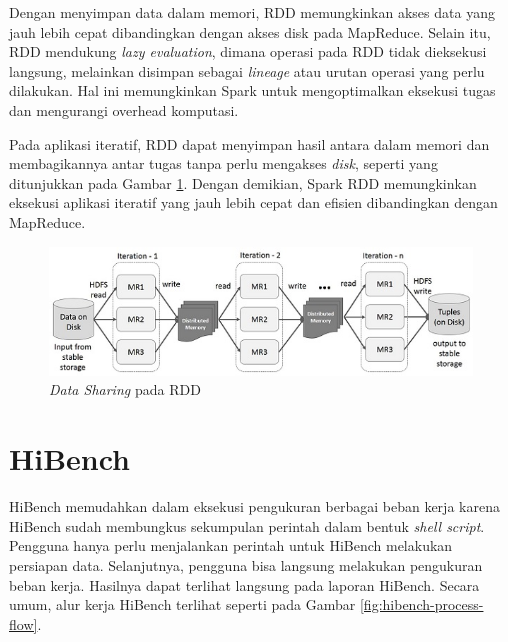 Dengan menyimpan data dalam memori, RDD memungkinkan akses data yang jauh lebih cepat dibandingkan dengan akses disk pada MapReduce. Selain itu, RDD mendukung \textit{lazy evaluation}, dimana operasi pada RDD tidak dieksekusi langsung, melainkan disimpan sebagai \textit{lineage} atau urutan operasi yang perlu dilakukan. Hal ini memungkinkan Spark untuk mengoptimalkan eksekusi tugas dan mengurangi overhead komputasi.

Pada aplikasi iteratif, RDD dapat menyimpan hasil antara dalam memori dan membagikannya antar tugas tanpa perlu mengakses \textit{disk}, seperti yang ditunjukkan pada Gambar \ref{fig:iterative_operations_on_spark_rdd}. Dengan demikian, Spark RDD memungkinkan eksekusi aplikasi iteratif yang jauh lebih cepat dan efisien dibandingkan dengan MapReduce.

\begin{figure}[h]
    \centering
    \includegraphics[width=1\textwidth]{figures/ch02/iterative_operations_on_spark_rdd}
    \caption{\textit{Data Sharing} pada RDD \cite{ApacheSparkIntroduction}}
    \label{fig:iterative_operations_on_spark_rdd}
\end{figure}

\section{HiBench}
HiBench memudahkan dalam eksekusi pengukuran berbagai beban kerja karena HiBench sudah membungkus sekumpulan perintah dalam bentuk \textit{shell script}\cite{samadiPerformanceComparisonHadoop2018}. Pengguna hanya perlu menjalankan perintah untuk HiBench melakukan persiapan data. Selanjutnya, pengguna bisa langsung melakukan pengukuran beban kerja. Hasilnya dapat terlihat langsung pada laporan HiBench. Secara umum, alur kerja HiBench terlihat seperti pada Gambar \ref{fig:hibench-process-flow}.


